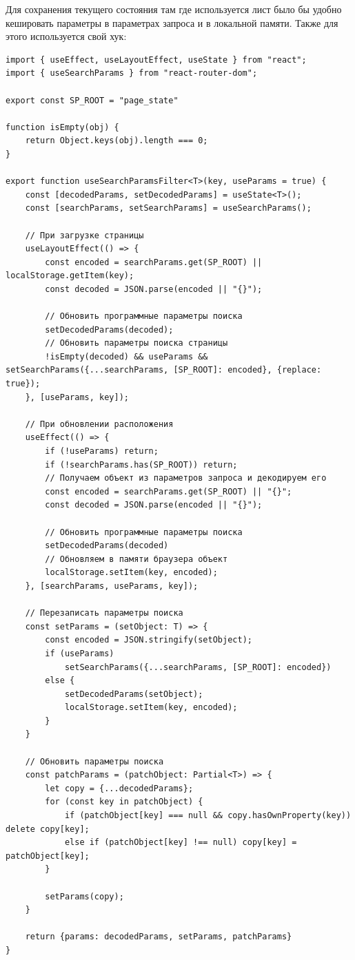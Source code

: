 \documentclass[a4paper,14pt]{extarticle}
\begin{document}
Для сохранения текущего состояния там где используется лист было бы 
удобно кешировать параметры в параметрах запроса и в локальной памяти. 
Также для этого используется свой хук:
\begin{verbatim}
import { useEffect, useLayoutEffect, useState } from "react";
import { useSearchParams } from "react-router-dom";

export const SP_ROOT = "page_state"

function isEmpty(obj) {
    return Object.keys(obj).length === 0;
}

export function useSearchParamsFilter<T>(key, useParams = true) {
    const [decodedParams, setDecodedParams] = useState<T>();
    const [searchParams, setSearchParams] = useSearchParams();

    // При загрузке страницы
    useLayoutEffect(() => {
        const encoded = searchParams.get(SP_ROOT) || localStorage.getItem(key);
        const decoded = JSON.parse(encoded || "{}");

        // Обновить программные параметры поиска
        setDecodedParams(decoded);
        // Обновить параметры поиска страницы
        !isEmpty(decoded) && useParams && setSearchParams({...searchParams, [SP_ROOT]: encoded}, {replace: true});
    }, [useParams, key]);

    // При обновлении расположения
    useEffect(() => {
        if (!useParams) return;
        if (!searchParams.has(SP_ROOT)) return;
        // Получаем объект из параметров запроса и декодируем его
        const encoded = searchParams.get(SP_ROOT) || "{}";
        const decoded = JSON.parse(encoded || "{}");

        // Обновить программные параметры поиска
        setDecodedParams(decoded)
        // Обновляем в памяти браузера объект
        localStorage.setItem(key, encoded);
    }, [searchParams, useParams, key]);

    // Перезаписать параметры поиска
    const setParams = (setObject: T) => {
        const encoded = JSON.stringify(setObject);
        if (useParams)
            setSearchParams({...searchParams, [SP_ROOT]: encoded}) 
        else {
            setDecodedParams(setObject);
            localStorage.setItem(key, encoded);
        }
    }

    // Обновить параметры поиска
    const patchParams = (patchObject: Partial<T>) => {
        let copy = {...decodedParams};
        for (const key in patchObject) {
            if (patchObject[key] === null && copy.hasOwnProperty(key)) delete copy[key];
            else if (patchObject[key] !== null) copy[key] = patchObject[key];
        }

        setParams(copy);
    }

    return {params: decodedParams, setParams, patchParams}
}
\end{verbatim}
\end{document}
